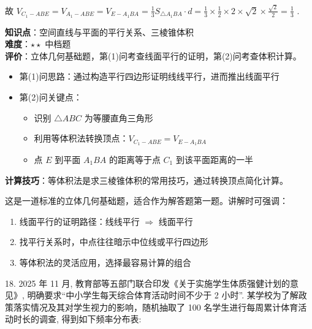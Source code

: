 \documentclass[10pt]{article}
\begin{document}
故 \({V}_{{C}_{1} - {ABE}} = {V}_{{A}_{1} - {ABE}} = {V}_{E - {A}_{1}{BA}} = \frac{1}{3}{S}_{\bigtriangleup {A}_{1}{BA}} \cdot  d = \frac{1}{3} \times  \frac{1}{2} \times  2 \times  \sqrt{2} \times  \frac{\sqrt{2}}{2} = \frac{1}{3}\) .

\begin{analysisbox}[考点分析]
\textbf{知识点}：空间直线与平面的平行关系、三棱锥体积\\
\textbf{难度}：\(\star\star\) 中档题\\
\textbf{评价}：立体几何基础题，第(1)问考查线面平行的证明，第(2)问考查体积计算。
\begin{itemize}
\item 第(1)问思路：通过构造平行四边形证明线线平行，进而推出线面平行
\item 第(2)问关键点：
  \begin{itemize}
  \item 识别 \(\triangle ABC\) 为等腰直角三角形
  \item 利用等体积法转换顶点：\(V_{C_1-ABE} = V_{E-A_1BA}\)
  \item 点 \(E\) 到平面 \(A_1BA\) 的距离等于点 \(C_1\) 到该平面距离的一半
  \end{itemize}
\end{itemize}
\textbf{计算技巧}：等体积法是求三棱锥体积的常用技巧，通过转换顶点简化计算。
\end{analysisbox}

\begin{tipbox}[教学提示]
这是一道标准的立体几何基础题，适合作为解答题第一题。讲解时可强调：
\begin{enumerate}
\item 线面平行的证明路径：线线平行 $\Rightarrow$ 线面平行
\item 找平行关系时，中点往往暗示中位线或平行四边形
\item 等体积法的灵活应用，选择最容易计算的组合
\end{enumerate}
\end{tipbox}

18. 2025 年 11 月, 教育部等五部门联合印发《关于实施学生体质强健计划的意见》, 明确要求``中小学生每天综合体育活动时间不少于 2 小时''. 某学校为了解政策落实情况及其对学生视力的影响，随机抽取了 100 名学生进行每周累计体育活动时长的调查, 得到如下频率分布表:

\begin{center}
\end{center}
\end{document}
